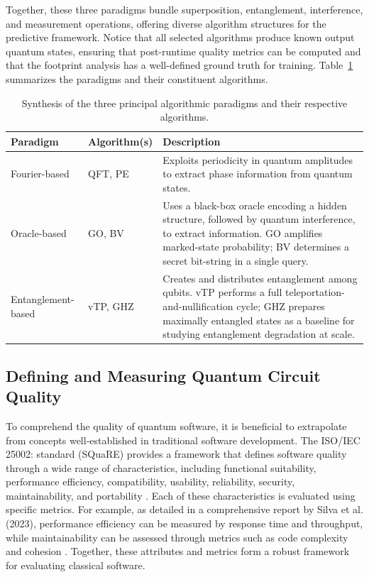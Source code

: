 \documentclass{article}
\begin{document}
Together, these three paradigms bundle superposition, entanglement, interference, and measurement \cite{juarezramirezTaxonomicViewFundamental_2023} operations, offering diverse algorithm structures for the predictive framework. Notice that all selected algorithms produce known output quantum states, ensuring that post-runtime quality metrics can be computed and that the footprint analysis has a well-defined ground truth for training. Table~\ref{tab:paradigms} summarizes the paradigms and their constituent algorithms.

\begin{table}[ht]
\centering
\caption{Synthesis of the three principal algorithmic paradigms and their respective algorithms.}
\label{tab:paradigms}
\begin{tabular}{>{\raggedright\arraybackslash}p{2cm} >{\raggedright\arraybackslash}p{2cm} >{\raggedright\arraybackslash}p{6.8cm}}
\toprule
\textbf{Paradigm} & \textbf{Algorithm(s)} & \textbf{Description} \\
\midrule
Fourier-based & QFT, PE & Exploits periodicity in quantum amplitudes to extract phase information from quantum states. \\
\addlinespace
Oracle-based & GO, BV & Uses a black-box oracle encoding a hidden structure, followed by quantum interference, to extract information. GO amplifies marked-state probability; BV determines a secret bit-string in a single query. \\
\addlinespace
Entanglement-based & vTP, GHZ & Creates and distributes entanglement among qubits. vTP performs a full teleportation-and-nullification cycle; GHZ prepares maximally entangled states as a baseline for studying entanglement degradation at scale. \\
\bottomrule
\end{tabular}
\end{table}

\subsection{Defining and Measuring Quantum Circuit Quality}

To comprehend the quality of quantum software, it is beneficial to extrapolate from concepts well-established in traditional software development. The ISO/IEC 25002: standard (SQuaRE) provides a framework that defines software quality through a wide range of characteristics, including functional suitability, performance efficiency, compatibility, usability, reliability, security, maintainability, and portability \cite{ISOIEC25002}. Each of these characteristics is evaluated using specific metrics. For example, as detailed in a comprehensive report by Silva et al. (2023), performance efficiency can be measured by response time and throughput, while maintainability can be assessed through metrics such as code complexity and cohesion \cite{Silva2023}. Together, these attributes and metrics form a robust framework for evaluating classical software.
\end{document}
